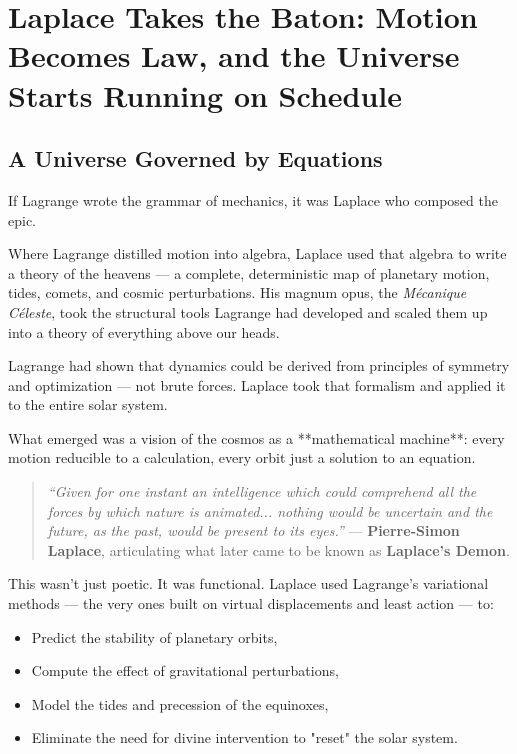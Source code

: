 \section{Laplace Takes the Baton: Motion Becomes Law, and the Universe Starts Running on Schedule}

\subsection{A Universe Governed by Equations}

If Lagrange wrote the grammar of mechanics, it was Laplace who composed the epic.

Where Lagrange distilled motion into algebra, Laplace used that algebra to write a theory of the heavens — a complete, deterministic map of planetary motion, tides, comets, and cosmic perturbations. His magnum opus, the \textit{Mécanique Céleste}, took the structural tools Lagrange had developed and scaled them up into a theory of everything above our heads.

Lagrange had shown that dynamics could be derived from principles of symmetry and optimization — not brute forces. Laplace took that formalism and applied it to the entire solar system.

What emerged was a vision of the cosmos as a **mathematical machine**: every motion reducible to a calculation, every orbit just a solution to an equation.

\begin{quote}
\textit{“Given for one instant an intelligence which could comprehend all the forces by which nature is animated... nothing would be uncertain and the future, as the past, would be present to its eyes.”}  
— \textbf{Pierre-Simon Laplace}, articulating what later came to be known as \textbf{Laplace’s Demon}.
\end{quote}

This wasn’t just poetic. It was functional. Laplace used Lagrange’s variational methods — the very ones built on virtual displacements and least action — to:
\begin{itemize}
    \item Predict the stability of planetary orbits,
    \item Compute the effect of gravitational perturbations,
    \item Model the tides and precession of the equinoxes,
    \item Eliminate the need for divine intervention to "reset" the solar system.
\end{itemize}

